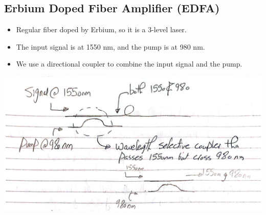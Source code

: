 \documentclass[11pt]{article}
\begin{document}
\subsection{Erbium Doped Fiber Amplifier (EDFA)}
\begin{itemize}
    \item Regular fiber doped by Erbium, so it is a 3-level laser.
    \item The input signal is at 1550 nm, and the pump is at 980 nm.
    \item We use a directional coupler to combine the input signal and the pump.
\end{itemize}
\begin{center}
    \includegraphics[scale=0.5]{3.png}
\end{center}
\end{document}
